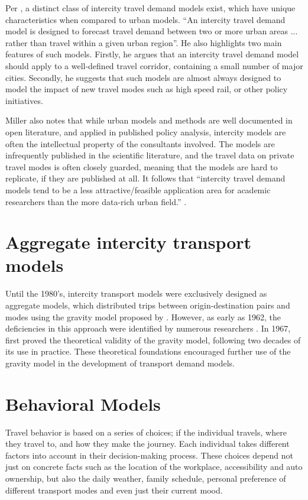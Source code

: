 Per \textcite{miller04}, a distinct class of intercity travel demand models exist, which have unique characteristics when compared to urban models. \enquote{An intercity travel demand model is designed to forecast travel demand between two or more urban areas ... rather than travel within a given urban region}. He also highlights two main features of such models. Firstly, he argues that an intercity travel demand model should apply to a well-defined travel corridor, containing a small number of major cities. Secondly, he suggests that such models are almost always designed to model the impact of new travel modes such as high speed rail, or other policy initiatives.

Miller also notes that while urban models and methods are well documented in open literature, and applied in published policy analysis, intercity models are often the intellectual property of the consultants involved. The models are infrequently published in the scientific literature, and the travel data on private travel modes is often closely guarded, meaning that the models are hard to replicate, if they are published at all. It follows that \enquote{intercity travel demand models tend to be a less attractive/feasible application area for academic researchers than the more data-rich urban field.} \parencite{miller04}.

\section{Aggregate intercity transport models}

Until the 1980’s, intercity transport models were exclusively designed as aggregate models, which distributed trips between origin-destination pairs and modes using the gravity model proposed by \textcite{casey55}. However, as early as 1962, the deficiencies in this approach were identified by numerous researchers \parencite{OiSchu62, Warner62}. In 1967, \textcite{Wilson67} first proved the theoretical validity of the gravity model, following two decades of its use in practice. These theoretical foundations encouraged further use of the gravity model in the development of transport demand models. 


\section{Behavioral Models}
Travel behavior is based on a series of choices; if the individual travels, where they travel to, and how they make the journey. Each individual takes different factors into account in their decision-making process. These choices depend not just on concrete facts such as the location of the workplace, accessibility and auto ownership, but also the daily weather, family schedule, personal preference of different transport modes and even just their current mood.

